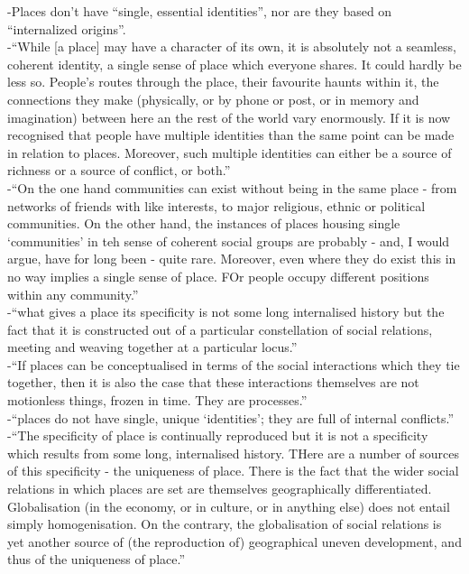 -{\color{orange}Places don’t have “single, essential identities”, nor are they based on “internalized origins”.}\cite{MasseyD1991}\\
-{\color{orange}“While [a place] may have a character of its own, it is absolutely not a seamless, coherent identity, a single sense of place which everyone shares. It could hardly be less so. People’s routes through the place, their favourite haunts within it, the connections they make (physically, or by phone or post, or in memory and imagination) between here an the rest of the world vary enormously. If it is now recognised that people have multiple identities than the same point can be made in relation to places. Moreover, such multiple identities can either be a source of richness or a source of conflict, or both.”}\cite{MasseyD1991}\\
-{\color{orange}“On the one hand communities can exist without being in the same place - from networks of friends with like interests, to major religious, ethnic or political communities. On the other hand, the instances of places housing single ‘communities’ in teh sense of coherent social groups are probably - and, I would argue, have for long been - quite rare. Moreover, even where they do exist this in no way implies a single sense of place. FOr people occupy different positions within any community.”}\cite{MasseyD1991}\\
-{\color{orange}“what gives a place its specificity is not some long internalised history but the fact that it is constructed out of a particular constellation of social relations, meeting and weaving together at a particular locus.”}\cite{MasseyD1991}\\
-{\color{orange}“If places can be conceptualised in terms of the social interactions which they tie together, then it is also the case that these interactions themselves are not motionless things, frozen in time. They are processes.”}\cite{MasseyD1991}\\
-{\color{orange}“places do not have single, unique ‘identities’; they are full of internal conflicts.”}\cite{MasseyD1991}\\
-{\color{orange}“The specificity of place is continually reproduced but it is not a specificity which results from some long, internalised history. THere are a number of sources of this specificity - the uniqueness of place. There is the fact that the wider social relations in which places are set are themselves geographically differentiated. Globalisation (in the economy, or in culture, or in anything else) does not entail simply homogenisation. On the contrary, the globalisation of social relations is yet another source of (the reproduction of) geographical uneven development, and thus of the uniqueness of place.”}\cite{MasseyD1991}\\
